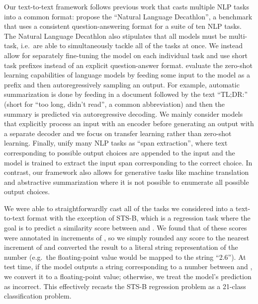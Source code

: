 \documentclass[twoside,11pt]{article}
\begin{document}
Our text-to-text framework follows previous work that casts multiple NLP tasks into a common format:
\citet{mccann2018natural} propose the ``Natural Language Decathlon'', a benchmark that uses a consistent question-answering format for a suite of ten NLP tasks.
The Natural Language Decathlon also stipulates that all models must be multi-task, i.e.\ are able to simultaneously tackle all of the tasks at once.
We instead allow for separately fine-tuning the model on each individual task and use short task prefixes instead of an explicit question-answer format.
\citet{radford2019language} evaluate the zero-shot learning capabilities of language models by feeding some input to the model as a prefix and then autoregressively sampling an output.
For example, automatic summarization is done by feeding in a document followed by the text ``TL;DR:'' (short for ``too long, didn't read'', a common abbreviation) and then the summary is predicted via autoregressive decoding.
We mainly consider models that explicitly process an input with an encoder before generating an output with a separate decoder and we focus on transfer learning rather than zero-shot learning.
Finally, \citet{keskar2019unifying} unify many NLP tasks as ``span extraction'', where text corresponding to possible output choices are appended to the input and the model is trained to extract the input span corresponding to the correct choice.
In contrast, our framework also allows for generative tasks like machine translation and abstractive summarization where it is not possible to enumerate all possible output choices.

We were able to straightforwardly cast all of the tasks we considered into a text-to-text format with the exception of STS-B, which is a regression task where the goal is to predict a similarity score between  and .
We found that  of these scores were annotated in increments of , so we simply rounded any score to the nearest increment of  and converted the result to a literal string representation of the number (e.g.\ the floating-point value  would be mapped to the string ``2.6'').
At test time, if the model outputs a string corresponding to a number between  and , we convert it to a floating-point value; otherwise, we treat the model's prediction as incorrect.
This effectively recasts the STS-B regression problem as a 21-class classification problem.
\end{document}
